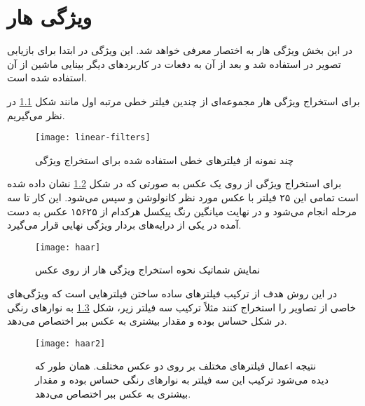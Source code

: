 \chapter{ویژگی هار} 
\label{app:haar}
در این بخش ویژگی هار به اختصار معرفی خواهد شد. این ویژگی در ابتدا برای بازیابی تصویر در   \cite{Tieu2004} استفاده شد و بعد از آن به دفعات در کاربردهای دیگر بینایی ماشین از آن استفاده شده است. 

برای  استخراج ویژگی هار مجموعه‌ای  از چندین فیلتر خطی مرتبه اول مانند شکل \ref{fig:linear-filters} در نظر می‌گیریم.
\begin{figure}[ht]
\centering
\texttt{[image: linear-filters]}
\caption {\small {چند نمونه از فیلترهای خطی استفاده شده برای استخراج ویژگی}}
\label{fig:linear-filters}
\end{figure}
برای استخراج ویژگی از روی یک عکس به صورتی که در شکل \ref{fig:haar} نشان داده شده است تمامی این ۲۵ فیلتر با عکس مورد نظر کانولوشن و سپس  می‌شود. این کار تا سه مرحله انجام می‌شود و در نهایت میانگین رنگ پیکسل هرکدام از ۱۵۶۲۵ عکس به دست آمده در یکی از درایه‌های بردار ویژگی نهایی قرار می‌گیرد. 
\begin{figure}[ht]
\centering
\texttt{[image: haar]}
\caption {\small {نمایش شماتیک نحوه استخراج ویژگی هار از روی عکس}}
\label{fig:haar}
\end{figure}
در این روش هدف از ترکیب فیلتر‌های ساده ساختن فیلترهایی است که ویژگی‌های خاصی از تصاویر را استخراج کنند مثلاً ترکیب سه فیلتر زیر، شکل \ref{fig:haar2} به نوارهای رنگی در شکل حساس بوده و مقدار بیشتری به عکس ببر اختصاص می‌دهد.
\begin{figure}
\centering
\texttt{[image: haar2]}
\caption{\small {نتیجه اعمال فیلترهای مختلف بر روی دو عکس مختلف. همان طور که دیده می‌شود ترکیب این سه فیلتر به نوارهای رنگی حساس بوده و مقدار بیشتری به عکس ببر اختصاص می‌دهد.}}
\label{fig:haar2}
\end{figure}
